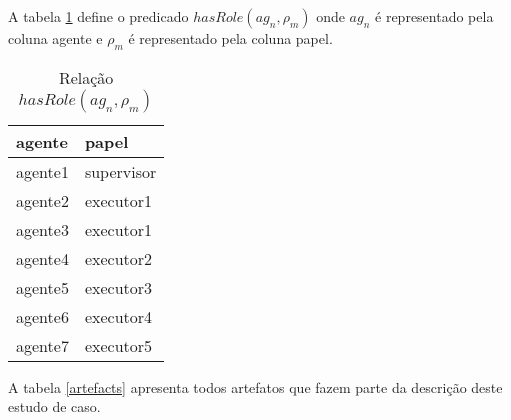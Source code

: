 A tabela \ref{agentsroles} define o predicado $hasRole(ag_n,\rho_m)$ onde $ag_n$ é representado pela coluna agente e $\rho_m$ é representado pela coluna papel.

\begin{table}[H]
\centering
\begin{tabular}{|l|l|}
\hline
\textbf{agente} & \textbf{papel} \\ \hline
agente1 & supervisor \\ \hline
agente2 & executor1 \\ \hline
agente3 & executor1 \\ \hline
agente4 & executor2 \\ \hline
agente5 & executor3 \\ \hline
agente6 & executor4 \\ \hline
agente7 & executor5 \\ \hline
\end{tabular}
\caption{Relação $hasRole(ag_n,\rho_m)$}
\label{agentsroles}
\end{table}

A tabela \ref{artefacts} apresenta todos artefatos que fazem parte da descrição deste estudo de caso.

